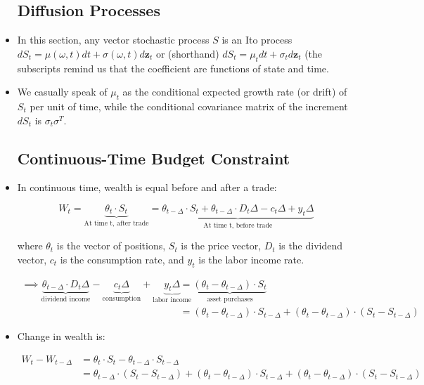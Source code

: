 \documentclass{article}
\newcommand{\zbf}{\mathbf{z}}
\begin{document}
\begin{itemize}

\subsection*{Diffusion Processes}

\item In this section, any vector stochastic process $S$ is an Ito process $dS_t = \mu(\omega, t) dt + \sigma(\omega, t) d \zbf_t$ or (shorthand) $dS_t = \mu_t dt + \sigma_t d \zbf_t$ (the subscripts remind us that the coefficient are functions of state and time.

\item We casually speak of $\mu_t$ as the conditional expected growth rate (or drift) of $S_t$ per unit of time, while the conditional covariance matrix of the increment $dS_t$ is $\sigma_t \sigma^T$.

\subsection*{Continuous-Time Budget Constraint}

\item In continuous time, wealth is equal before and after a trade:

$$
W_t = \underbrace{\theta_t \cdot S_t}_{\text{At time t, after trade}} = \underbrace{\theta_{t - \Delta} \cdot S_t + \theta_{t-\Delta} \cdot D_t \Delta - c_t \Delta + y_t \Delta}_{\text{At time t, before trade}}
$$

where $\theta_t$ is the vector of positions, $S_t$ is the price vector, $D_t$ is the dividend vector, $c_t$ is the consumption rate, and $y_t$ is the labor income rate.

\begin{align}
\implies \underbrace{\theta_{t-\Delta} \cdot D_t \Delta}_{\text{dividend income}} - \underbrace{c_t \Delta}_{\text{consumption}} + \underbrace{y_t \Delta}_{\text{labor income}}
&= \underbrace{(\theta_t - \theta_{t-\Delta}) \cdot S_t}_{\text{asset purchases}} \nonumber \\
&= (\theta_t - \theta_{t-\Delta}) \cdot S_{t - \Delta} + (\theta_t - \theta_{t-\Delta}) \cdot (S_t - S_{t - \Delta}) \label{w1}
\end{align}

\item Change in wealth is:

\begin{align}
W_t - W_{t-\Delta} 
&= \theta_t \cdot S_t - \theta_{t-\Delta} \cdot S_{t -\Delta} \nonumber\\
&= \theta_{t-\Delta} \cdot (S_t - S_{t-\Delta}) + (\theta_t - \theta_{t-\Delta}) \cdot S_{t-\Delta} + (\theta_t - \theta_{t-\Delta}) \cdot (S_t - S_{t -\Delta}) \label{w2}
\end{align}


\end{itemize}
\end{document}
